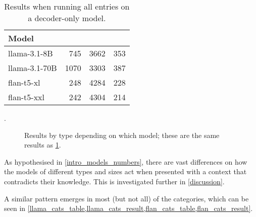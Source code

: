 \begin{table}[htbp]
	\centering
	\footnotesize
	\begin{tabular}{l r r r}
		\toprule
			\bfseries Model & \Parametric{} & \Contextual{} & \Other{} \\
		\midrule
			\ttfamily llama-3.1-8B & 745 & 3662 & 353 \\
			\ttfamily llama-3.1-70B & 1070 & 3303 & 387 \\
		\midrule
			\ttfamily flan-t5-xl  & 248 & 4284 & 228 \\
			\ttfamily flan-t5-xxl & 242 & 4304 & 214 \\
		\bottomrule
	\end{tabular}
	\caption{Results when running all entries on a decoder-only model.}
	\label{total_table}.
\end{table}

\begin{figure}[H]
	\centering
	\caption{Results by type depending on which model; these are the same results as \cref{total_table}.}
	\label{total_results}
\end{figure}

As hypothesised in \cref{intro_models_numbers}, there are vast differences on how the models of different types and sizes act when presented with a context that contradicts their knowledge.
This is investigated further in \cref{discussion}.

A similar pattern emerges in most (but not all) of the categories, which can be seen in \cref{llama_cats_table,llama_cats_result,flan_cats_table,flan_cats_result}.

